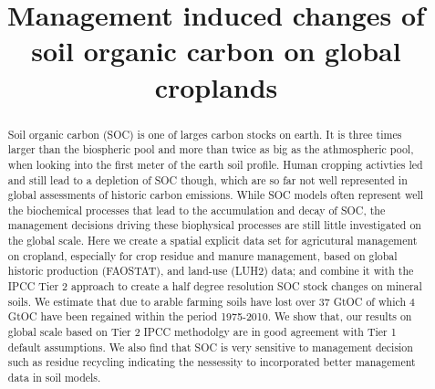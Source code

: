 \documentclass[gc, manuscript]{copernicus}
\begin{document}
\title{Management induced changes of soil organic carbon on global
croplands}











\received{}
\pubdiscuss{} %
\revised{}
\accepted{}
\published{}




\maketitle


\begin{abstract}
Soil organic carbon (SOC) is one of larges carbon stocks on earth. It is
three times larger than the biospheric pool and more than twice as big
as the athmospheric pool, when looking into the first meter of the earth
soil profile. Human cropping activties led and still lead to a depletion
of SOC though, which are so far not well represented in global
assessments of historic carbon emissions. While SOC models often
represent well the biochemical processes that lead to the accumulation
and decay of SOC, the management decisions driving these biophysical
processes are still little investigated on the global scale. Here we
create a spatial explicit data set for agricutural management on
cropland, especially for crop residue and manure management, based on
global historic production (FAOSTAT), and land-use (LUH2) data; and
combine it with the IPCC Tier 2 approach to create a half degree
resolution SOC stock changes on mineral soils. We estimate that due to
arable farming soils have lost over 37 GtOC of which 4 GtOC have been
regained within the period 1975-2010. We show that, our results on
global scale based on Tier 2 IPCC methodolgy are in good agreement with
Tier 1 default assumptions. We also find that SOC is very sensitive to
management decision such as residue recycling indicating the nessessity
to incorporated better management data in soil models.
\end{abstract}
\end{document}
